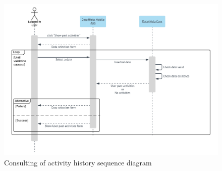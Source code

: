 \begin{figure}[H]
  \includegraphics[width=\textwidth,height=\textheight,keepaspectratio]{assets/sequence/ConsultingOfActivityHistory.pdf}
  \caption{Consulting of activity history sequence diagram}
  \label{fig:ConsultingOfActivityHistory}
\end{figure}









\newpage
